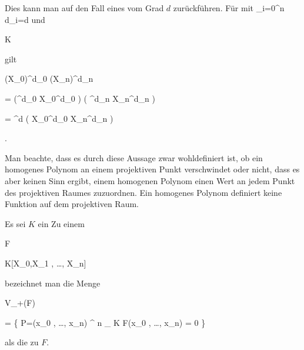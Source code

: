 {


Dies kann man auf den Fall eines
vom Grad $d$ zurückführen. Für   {  mit  }  {  \sum_{i=0}^n d_i=d   }{ } und


\mavergleichskette

{\vergleichskette

{ \lambda
}

{ \in }{ K
}

{  }{
}

{    }{
}

{   }{
}

}
{}{}{}
gilt


\mavergleichskettedisp

{\vergleichskette

{ (\lambda X_0)^{d_0 } \cdots (\lambda X_n)^{d_n }
}

{ =} { (\lambda^{d_0 } X_0^{d_0 }) \cdots ( \lambda^{d_n } X_n^{d_n } )
}

{ =} { \lambda^d  ( X_0^{d_0 } \cdots X_n^{d_n })
}

{ } {
}

{ } {
}

}
{}{}{.}


}


Man beachte, dass es durch diese Aussage zwar wohldefiniert ist, ob ein homogenes Polynom an einem projektiven Punkt verschwindet oder nicht, dass es aber keinen Sinn ergibt, einem homogenen Polynom einen Wert an jedem Punkt des projektiven Raumes zuzuordnen. Ein homogenes Polynom definiert keine Funktion auf dem projektiven Raum.



{}

{


Es sei $K$ ein
Zu einem


\mavergleichskette

{\vergleichskette

{F
}

{ \in }{ K[X_0,X_1 , \ldots , X_n]
}

{  }{
}

{    }{
}

{   }{
}

}
{}{}{}
bezeichnet man die Menge


\mavergleichskettedisphandlinks

{\vergleichskettedisphandlinks

{ V_+(F)
}

{ =} { \left\{ P=(x_0 , \ldots , x_n) ^{ n }_{ K }   \mid   F(x_0 , \ldots , x_n) = 0        \right\}
}

{ } {
}

{ } {
}

{ } {
}

}
{}{}{}
als die  zu $F$.


}


